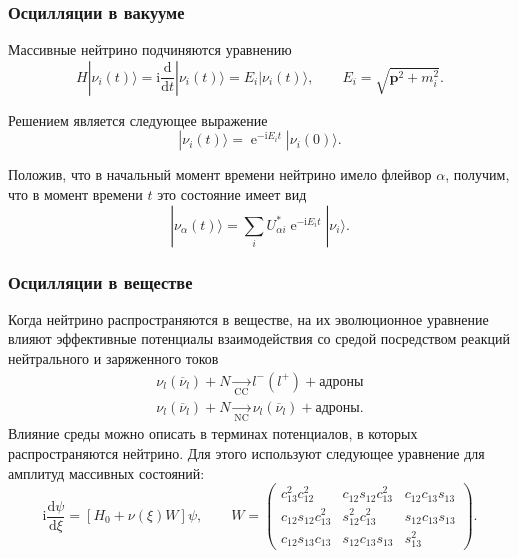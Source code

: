 \documentclass[utf8,9pt,mathserif,usepdftitle=false]{beamer}
\newcommand{\dd}{\mathrm{d}}
\renewcommand{\exp}{\operatorname{e}}
\renewcommand{\imath}{\mathrm{i}}
\newcommand\Vect[1]{{\boldsymbol{#1}}}
\begin{document}
\begin{frame}
  \frametitle{Осцилляции в вакууме}%
  Массивные нейтрино подчиняются уравнению
	\begin{equation}
		H|\nu_{i}(t)\rangle=\imath\frac{\dd}{\dd t}|\nu_{i}(t)\rangle=
		E_{i}|\nu_{i}(t)\rangle, \qquad E_{i}=\sqrt{\Vect{p}^{2}+m_{i}^{2}}.
	\end{equation}

	Решением является следующее выражение
	\begin{equation}
		|\nu_{i}(t)\rangle=\exp^{-\imath E_{i}t}|\nu_{i}(0)\rangle.
	\end{equation}

	Положив, что в начальный момент времени нейтрино имело флейвор
  \(\alpha\), получим, что в момент времени \(t\) это состояние имеет вид
	\begin{equation}
		|\nu_{\alpha}(t)\rangle=\sum_{i}U_{\alpha i}^{*}\exp^{-\imath E_{i}t}|\nu_{i}\rangle.
	\end{equation}
\end{frame}

\begin{frame}
	\frametitle{Осцилляции в веществе}%
	Когда нейтрино распространяются в веществе, на их эволюционное уравнение
  влияют эффективные потенциалы взаимодействия со средой посредством реакций
  нейтрального и заряженного токов
    \begin{align*}
  	\nu_{l}(\overline{\nu}_{l})+N\xrightarrow[\text{CC}]{}l^{-}(l^{+})+\text{адроны}\\[2ex]
  	\nu_{l}(\overline{\nu}_{l})+N\xrightarrow[\text{NC}]{}\nu_{l}(\overline{\nu}_{l})+\text{адроны}.
  \end{align*}
	Влияние среды можно описать в терминах потенциалов, в которых
	распространяются нейтрино. Для этого используют следующее уравнение для амплитуд 
	массивных состояний:
	\onslide<3->%
	\begin{equation}\label{eq:2}
		\imath\frac{\dd\psi}{\dd\xi}=[H_{0}+\nu(\xi)W]\psi, 
		\qquad
		 W=
		\begin{pmatrix}
			c_{13}^{2}c_{12}^{2} & c_{12}s_{12}c_{13}^{2} & c_{12}c_{13}s_{13}\\
			c_{12}s_{12}c_{13}^{2} & s_{12}^{2}c_{13}^{2} & s_{12}c_{13}s_{13}\\
			c_{12}s_{13}c_{13} & s_{12}c_{13}s_{13} & s_{13}^{2}
		\end{pmatrix}.
	\end{equation}
\end{frame}
\end{document}
